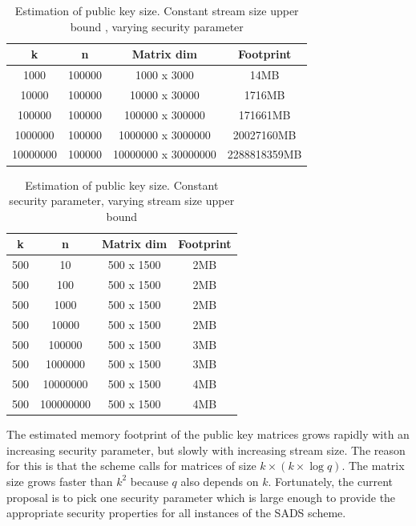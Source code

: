 \documentclass[11pt, letterpaper, oneside]{article}
\begin{document}
	\begin{table}[h]
	\centering
	
		\begin{tabular} { c | c | c | c}
		
		k & n & Matrix dim & Footprint\\ \hline
		1000&100000&1000 x 3000&14MB\\
		10000&100000&10000 x 30000&1716MB\\
		100000&100000&100000 x 300000&171661MB\\
		1000000&100000&1000000 x 3000000&20027160MB\\
		10000000&100000&10000000 x 30000000&2288818359MB\\	
		\end{tabular}
	
	\caption{Estimation of public key size.  Constant stream size upper bound , varying security parameter } 
	\label{tab:pub-key_k}
	\end{table}
	
	
	\begin{table}[h]
	\centering
		\begin{tabular}{ c | c | c | c}
		k & n & Matrix dim & Footprint\\ \hline
		500&10&500 x 1500&2MB\\
		500&100&500 x 1500&2MB\\
		500&1000&500 x 1500&2MB\\
		500&10000&500 x 1500&2MB\\
		500&100000&500 x 1500&3MB\\
		500&1000000&500 x 1500&3MB\\
		500&10000000&500 x 1500&4MB\\
		500&100000000&500 x 1500&4MB\\
		
		\end{tabular}
	\caption{ Estimation of public key size.  Constant security parameter, varying stream size upper bound }
	\label{tab:pub-key_n}
	\end{table}
	

	The estimated memory footprint of the public key matrices grows rapidly with an increasing security parameter, but slowly with increasing stream size.
	The reason for this is that the scheme calls for matrices of size $k  \times ( k \times \log q )$.
	The matrix size grows faster than $k^2$ because $q$ also depends on $k$.
	Fortunately, the current proposal is to pick one security parameter which is large enough to provide the appropriate security properties for all instances of the SADS scheme.
	
\end{document}
